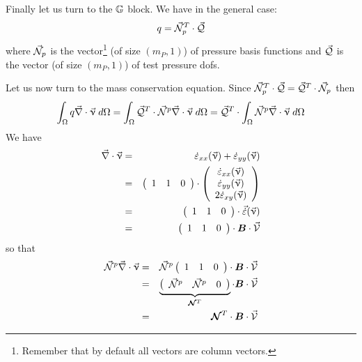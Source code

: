 Finally let us turn to the ${\mathbb{G}}$ block.
We have in the general case:
\[
q = \vec{{\mathcal{N}}}_p^T \cdot \vec{\cal Q}
\]
where $\vec{{\mathcal{N}}}_p$ is the vector\footnote{Remember that by 
default all vectors are column vectors.} (of size $(m_P,1)$) 
of pressure basis functions
and $\vec{\cal Q}$ is the vector (of size $(m_P,1)$) of test pressure dofs.

Let us now turn to the mass conservation equation.
Since $\vec{{\mathcal{N}}}_p^T \cdot \vec{\cal Q}= \vec{\cal Q}^T \cdot \vec{{\mathcal{N}}}_p$ then
\[
\int_\Omega q \vec\nabla \cdot \vec{\upnu} \; d\Omega 
=\int_\Omega \vec{\cal Q}^T \cdot \vec{\cal N}^p \vec\nabla \cdot \vec{\upnu} \; d\Omega  
=\vec{\cal Q}^T \cdot \int_\Omega \vec{\cal N}^p \vec\nabla \cdot \vec{\upnu} \; d\Omega  
\]
We have 
\begin{eqnarray}
\vec\nabla \cdot \vec{\upnu} 
&=&
\dot \varepsilon_{xx}(\vec\upnu) + \dot \varepsilon_{yy}(\vec\upnu) \\
&=& 
\left(
\begin{array}{ccc}
1 & 1  & 0 
\end{array}
\right)
\cdot
\left(
\begin{array}{c}
\dot \varepsilon_{xx}(\vec\upnu) \\
\dot \varepsilon_{yy}(\vec\upnu) \\
2\dot \varepsilon_{xy}(\vec\upnu)
\end{array}
\right) \nonumber\\
&=&
\left(
\begin{array}{ccc}
1 & 1 & 0 
\end{array}
\right)
\cdot
\vec{\dot \varepsilon}(\vec\upnu)  \nonumber\\
&=&
\left(
\begin{array}{ccc}
1 & 1 & 0 
\end{array}
\right)
\cdot
{\bm B} \cdot \vec{\cal V}
\end{eqnarray}
so that
\begin{eqnarray}
\vec{\cal N}^p  \vec\nabla \cdot \vec{\upnu}
&=& \vec{\cal N}^p  
\left(
\begin{array}{ccc}
1 & 1 & 0 
\end{array}
\right)
\cdot
{\bm B} \cdot \vec{\cal V} \nonumber\\
&=&
\underbrace{
\left(
\begin{array}{cccccc}
\vec{\cal N}^p & \vec{\cal N}^p & 0 
\end{array}
\right)
}_{{\bm {{\mathcal{N}}}}^T}
\cdot
{\bm B} \cdot \vec{\cal V} \nonumber\\
&=&
{\bm {{\mathcal{N}}}}^T \cdot {\bm B} \cdot \vec{\cal V}
\end{eqnarray}
